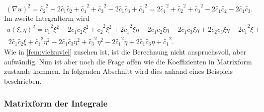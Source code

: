 \begin{equation}
	(\nabla u)^2 = \tilde{c_2}^2 - 2 \tilde{c_1} \tilde{c_2} + \tilde{c_1}^2 + \tilde{c_3}^2 -2 \tilde{c_1}\tilde{c_3} + \tilde{c_1}^2 = 2\tilde{c_1}^2 + \tilde{c_2}^2 + \tilde{c_3}^2 -2\tilde{c_1}\tilde{c_2} -2\tilde{c_1}\tilde{c_3}.
	\label{fem:equationSchwarzquadratischQ2}
\end{equation}
Im zweite Integralterm wird 
\begin{multline}
	u(\xi, \eta)^2 = \tilde{c_1}^2 \xi^2  - 2 \tilde{c_1} \tilde{c_2} \xi^2 + \tilde{c_2}^2 \xi^2 + 2 \tilde{c_1}^2 \xi \eta - 2 \tilde{c_1} \tilde{c_2} \xi \eta - 2 \tilde{c_1} \tilde{c_3} \xi \eta + 2 \tilde{c_2} \tilde{c_3} \xi \eta - 2 \tilde{c_1}^2 \xi + \\\ 2 \tilde{c_1} \tilde{c_2} \xi + \tilde{c_1}^2 \eta^2 - 2 \tilde{c_1} \tilde{c_3} \eta^2 + \tilde{c_3}^2 \eta^2 - 2 \tilde{c_1}^2 \eta + 2 \tilde{c_1} \tilde{c_3} \eta + \tilde{c_1}^2.
	\label{fem:vielzuviel}
\end{multline}
Wie in \eqref{fem:vielzuviel} zusehen ist, ist die Berechnung nicht
anspruchsvoll, aber aufwändig.
Nun ist aber noch die Frage offen wie die Koeffizienten in Matrixform
zustande kommen.
In folgenden Abschnitt wird dies anhand eines Beispiels beschrieben.

\subsubsection{Matrixform der Integrale
\label{fem:section:GL}}

